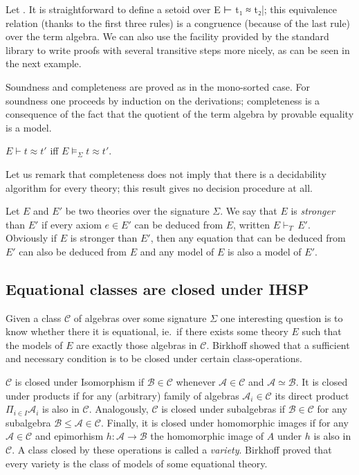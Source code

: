 Let . It is straightforward to
define a setoid over E ⊢ t₁ ≈
t₂|; this equivalence relation (thanks to the first three rules) is a
congruence (because of the last rule) over the term algebra. We can
also use the facility provided by the standard library to write
proofs with several transitive steps more nicely, as can be seen
in the next example.

Soundness and completeness are proved as in the
mono-sorted case. For soundness one proceeds by induction on the
derivations; completeness is a consequence of the fact that the quotient of the
term algebra by provable equality is a model.
\begin{theorem}
  $E \vdash t ≈ t'$ iff $E \models_{\Sigma} t ≈ t'$.
\end{theorem}
\noindent Let us remark that completeness does not imply that there is a
decidability algorithm for every theory; \ie this result gives no decision
procedure at all.

Let $E$ and $E'$ be two theories over the signature $\Sigma$. We say
that $E$ is \emph{stronger} than $E'$ if every axiom $e \in E'$ can be
deduced from $E$, written $E \vdash_{T}\, E'$.  Obviously if $E$
is stronger than $E'$, then any equation that can be deduced from $E'$
can also be deduced from $E$ and any model of $E$ is also a model of
$E'$.

\subsection{Equational classes are closed under IHSP}

Given a class $\mathcal{C}$ of algebras over some signature $\Sigma$
one interesting question is to know whether there it is equational,
ie.\ if there exists some theory $E$ such that the models of $E$ are
exactly those algebras in $\mathcal{C}$. Birkhoff showed that a
sufficient and necessary condition is to be closed under certain
class-operations.

$\mathcal{C}$ is closed under Isomorphism if
$\mathcal{B}\in \mathcal{C}$ whenever $\mathcal{A}\in \mathcal{C}$ and
$\mathcal{A}\simeq \mathcal{B}$. It is closed under products if for
any (arbitrary) family of algebras $\mathcal{A}_i\in \mathcal{C}$ its
direct product $\Pi_{i\in I} \mathcal{A}_i$ is also in
$\mathcal{C}$. Analogously, $\mathcal{C}$ is closed under subalgebras
if $\mathcal{B}\in \mathcal{C}$ for any subalgebra
$\mathcal{B}\leqslant \mathcal{A} \in \mathcal{C}$. Finally, it is
closed under homomorphic images if for any
$\mathcal{A} \in \mathcal{C}$ and epimorhism
$h : \mathcal{A} \to \mathcal{B}$ the homomorphic image of $A$ under
$h$ is also in $\mathcal{C}$. A class closed by these operations is
called a \emph{variety}. Birkhoff proved that every variety is the
class of models of some equational theory.

